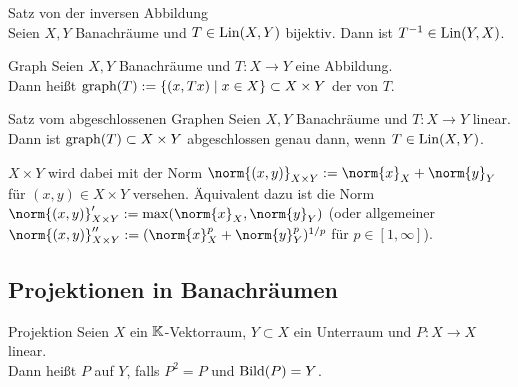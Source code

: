 \begin{Satz}{Satz von der inversen Abbildung}\\
    Seien $X, Y$ Banachräume und $T \in \operatorname{Lin}(X, Y)$ bijektiv.
    Dann ist $T^{-1} \in \operatorname{Lin}(Y, X)$.
\end{Satz}

\linie

\begin{Def}{Graph}
    Seien $X, Y$ Banachräume und $T\colon X \rightarrow Y$ eine Abbildung.\\
    Dann heißt
    $\text{graph}(T) := \{(x, Tx) \;|\; x \in X\} \subset X \times Y$ der  von $T$.
\end{Def}

\begin{Satz}{Satz vom abgeschlossenen Graphen}
    Seien $X, Y$ Banachräume und $T\colon X \rightarrow Y$ linear.\\
    Dann ist $\text{graph}(T) \subset X \times Y$ abgeschlossen genau dann, wenn $T \in \operatorname{Lin}(X, Y)$.
\end{Satz}

\begin{Bem}
    $X \times Y$ wird dabei mit der Norm $\norm{(x, y)}_{X \times Y} := \norm{x}_X + \norm{y}_Y$
    für $(x, y) \in X \times Y$ versehen.
    Äquivalent dazu ist die Norm $\norm{(x, y)}_{X \times Y}' := \max(\norm{x}_X, \norm{y}_Y)$
    (oder allgemeiner $\norm{(x, y)}_{X \times Y}'' := (\norm{x}_X^p + \norm{y}_Y^p)^{1/p}$
    für $p \in [1, \infty]$).
\end{Bem}

\pagebreak

\subsection{%
    Projektionen in Banachräumen%
}

\begin{Def}{Projektion}
    Seien $X$ ein $\mathbb{K}$-Vektorraum, $Y \subset X$ ein Unterraum und
    $P\colon X \rightarrow X$ linear.\\
    Dann heißt $P$  auf $Y$,
    falls $P^2 = P$ und $\text{Bild}(P) = Y$.
\end{Def}


